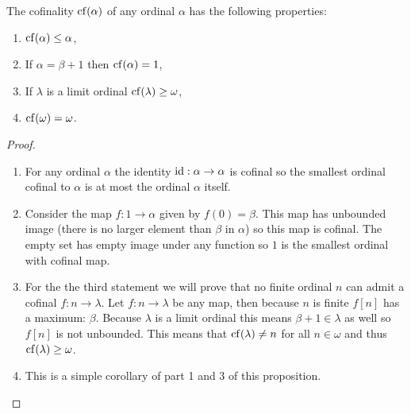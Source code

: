 \begin{proposition}
    \label{prop:cof-basics}
    The cofinality \(\operatorname{cf}(\alpha)\) of any ordinal \(\alpha\) has the following
    properties:
    \begin{enumerate}
        \item \(\operatorname{cf}(\alpha)\leq\alpha\),
        \item If \(\alpha=\beta+1\) then \(\operatorname{cf}(\alpha)=1\),
        \item If \(\lambda\) is a limit ordinal \(\operatorname{cf}(\lambda)\geq\omega\),
        \item \(\operatorname{cf}(\omega)=\omega\).
    \end{enumerate}

    \begin{proof}
        \begin{enumerate}
            \item For any ordinal \(\alpha\) the identity
                  \(\operatorname{id}:\alpha\to\alpha\) is cofinal so the smallest ordinal cofinal
                  to \(\alpha\) is at most the ordinal \(\alpha\) itself.

            \item Consider the map \(f:1\to \alpha\) given by \(f(0)=\beta\).
                  This map has unbounded image (there is no larger element than
                  \(\beta\) in \(\alpha\)) so this map is cofinal. The empty set has
                  empty image under any function so \(1\) is the smallest ordinal with
                  cofinal map.

            \item For the the third statement we will prove that no finite
                  ordinal \(n\) can admit a cofinal \(f:n\to\lambda\). Let
                  \(f:n\to\lambda\) be any map, then because \(n\) is finite
                  \(f[n]\) has a maximum: \(\beta\). Because \(\lambda\) is a
                  limit ordinal this means \(\beta+1\in\lambda\) as well so
                  \(f[n]\) is not unbounded. This means that \(\operatorname{cf}(\lambda)\neq n\)
                  for all \(n\in\omega\) and thus \(\operatorname{cf}(\lambda)\geq\omega\).

            \item This is a simple corollary of part 1 and 3 of this
                  proposition.
        \end{enumerate}
    \end{proof}
\end{proposition}

